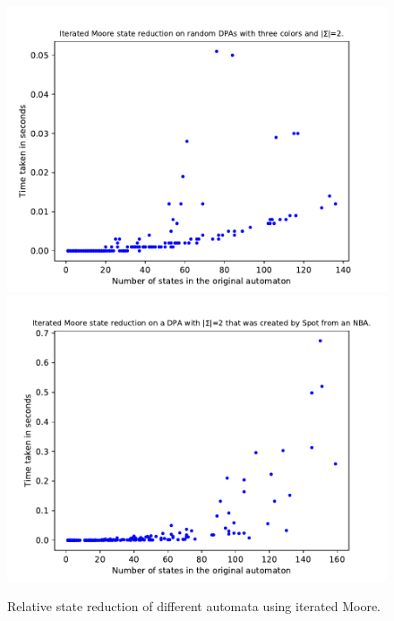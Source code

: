 \begin{figure}
\begin{minipage}{0.49\textwidth}
		\caption{Relative state reduction of different automata using iterated Moore.}
		\label{exp:fig:iterated_moore_reduct_sccs}
	\end{minipage}
	\hfill
	\begin{minipage}{0.49\textwidth}
		\includegraphics[page=5,height=.3\textheight]{../data/analysis/iterated_moore/gendet_ap1.pdf} 
		\includegraphics[page=5,height=.3\textheight]{../data/analysis/iterated_moore/detspot_ap1.pdf} 

\end{minipage}
\end{figure}
